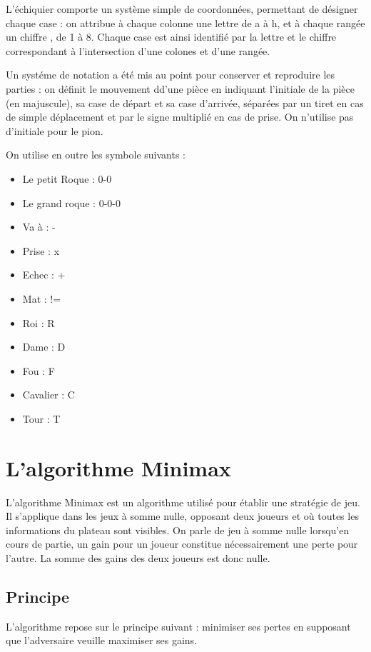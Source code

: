 \documentclass[12pt]{article}
\begin{document}
L'échiquier comporte un système simple de coordonnées, permettant de
désigner chaque case : on attribue à chaque colonne une lettre de a à h,
et à chaque rangée un chiffre , de 1 à 8. Chaque case est ainsi
identifié par la lettre et le chiffre correspondant à l'intersection
d'une colones et d'une rangée.

Un systéme de notation a été mis au point pour conserver et reproduire
les parties : on définit le mouvement dd'une pièce en indiquant
l'initiale de la pièce (en majuscule), sa case de départ et sa case
d'arrivée, séparées par un tiret en cas de simple déplacement et par le
signe multiplié en cas de prise. On n'utilise pas d'initiale pour le
pion.

On utilise en outre les symbole suivants :

\begin{itemize}
\item
  Le petit Roque : 0-0
\item
  Le grand roque : 0-0-0
\item
  Va à : -
\item
  Prise : x
\item
  Echec : +
\item
  Mat : !=
\item
  Roi : R
\item
  Dame : D
\item
  Fou : F
\item
  Cavalier : C
\item
  Tour : T
\end{itemize}

\section{L'algorithme Minimax}\label{lalgorithme-minimax}

L'algorithme Minimax est un algorithme utilisé pour établir une
stratégie de jeu. Il s'applique dans les jeux à somme nulle, opposant
deux joueurs et où toutes les informations du plateau sont visibles. On
parle de jeu à somme nulle lorsqu'en cours de partie, un gain pour un
joueur constitue nécessairement une perte pour l'autre. La somme des
gains des deux joueurs est donc nulle.

\subsection{Principe}\label{principe}

L'algorithme repose sur le principe suivant : minimiser ses pertes en
supposant que l'adversaire veuille maximiser ses gains.
\end{document}
